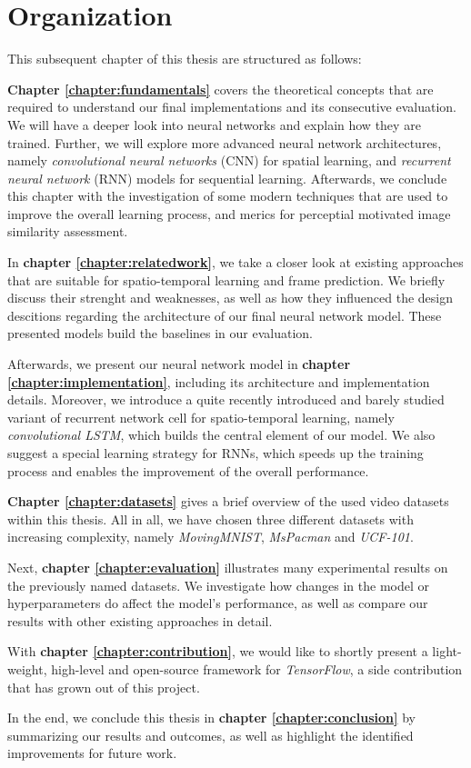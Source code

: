 \section{Organization}

This subsequent chapter of this thesis are structured as follows:

\textbf{Chapter \ref{chapter:fundamentals}} covers the theoretical concepts that are required to understand our final implementations and its consecutive evaluation. We will have a deeper look into neural networks and explain how they are trained. Further, we will explore more advanced neural network architectures, namely \textit{convolutional neural networks} (CNN) for spatial learning, and \textit{recurrent neural network} (RNN) models for sequential learning. Afterwards, we conclude this chapter with the investigation of some modern techniques that are used to improve the overall learning process, and merics for perceptial motivated image similarity assessment.

In \textbf{chapter \ref{chapter:relatedwork}}, we take a closer look at existing approaches that are suitable for spatio-temporal learning and frame prediction. We briefly discuss their strenght and weaknesses, as well as how they influenced the design descitions regarding the architecture of our final neural network model. These presented models build the baselines in our evaluation.

Afterwards, we present our neural network model in \textbf{chapter \ref{chapter:implementation}}, including its architecture and implementation details. Moreover, we introduce a quite recently introduced and barely studied variant of recurrent network cell for spatio-temporal learning, namely \textit{convolutional LSTM}, which builds the central element of our model. We also suggest a special learning strategy for RNNs, which speeds up the training process and enables the improvement of the overall performance.

\textbf{Chapter \ref{chapter:datasets}} gives a brief overview of the used video datasets within this thesis. All in all, we have chosen three different datasets with increasing complexity, namely \textit{MovingMNIST}, \textit{MsPacman} and \textit{UCF-101}.

Next, \textbf{chapter \ref{chapter:evaluation}} illustrates many experimental results on the previously named datasets. We investigate how changes in the model or hyperparameters do affect the model's performance, as well as compare our results with other existing approaches in detail.

With \textbf{chapter \ref{chapter:contribution}}, we would like to shortly present a light-weight, high-level and open-source framework for \textit{TensorFlow}, a side contribution that has grown out of this project.

In the end, we conclude this thesis in \textbf{chapter \ref{chapter:conclusion}} by summarizing our results and outcomes, as well as highlight the identified improvements for future work.



